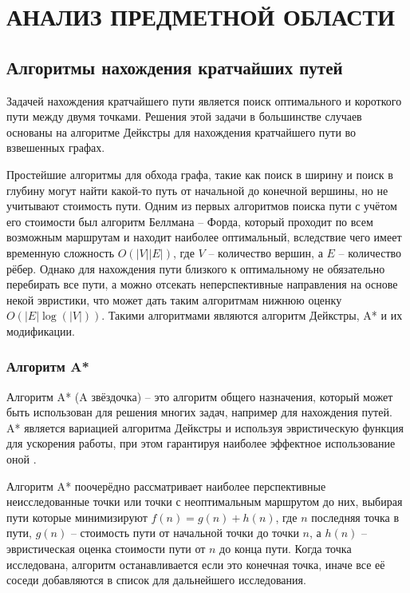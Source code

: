 \section[Анализ предметной области]{\MakeTextUppercase{АНАЛИЗ ПРЕДМЕТНОЙ ОБЛАСТИ}}
\vspace{-1\baselineskip} 
\subsection{Алгоритмы нахождения кратчайших путей}

Задачей нахождения кратчайшего пути является поиск оптимального и короткого пути между двумя точками. Решения этой задачи в большинстве случаев основаны на алгоритме Дейкстры \cite{Dijkstra} для нахождения кратчайшего пути во взвешенных графах. 

Простейшие алгоритмы для обхода графа, такие как поиск в ширину и поиск в глубину могут найти какой-то путь от начальной до конечной вершины, но не учитывают стоимость пути. Одним из первых алгоритмов поиска пути с учётом его стоимости был алгоритм Беллмана -- Форда, который проходит по всем возможным маршрутам и находит наиболее оптимальный, вследствие чего имеет временную сложность $O(|V||E|)$, где $V$ -- количество вершин, а $E$ -- количество рёбер. Однако для нахождения пути близкого к оптимальному не обязательно перебирать все пути, а можно отсекать неперспективные направления на основе некой эвристики, что может дать таким алгоритмам нижнюю оценку $O(|E|\log(|V|))$. Такими алгоритмами являются алгоритм Дейкстры, A* и их модификации.

\subsubsection{Алгоритм A*}

Алгоритм A{*} (A звёздочка) -- это алгоритм общего назначения, который может быть использован для решения многих задач, например для нахождения путей. A{*} является вариацией алгоритма Дейкстры и используя эвристическую функция для ускорения работы, при этом гарантируя наиболее эффектное использование оной \cite{A_STAR}. 

Алгоритм A{*} поочерёдно рассматривает наиболее перспективные неисследованные точки или точки с неоптимальным маршрутом до них, выбирая пути которые минимизируют $ f(n) = g(n) + h(n) $, где $n$ последняя точка в пути, $g(n)$ -- стоимость пути от начальной точки до точки $n$, а $h(n)$ -- эвристическая оценка стоимости пути от $n$ до конца пути. Когда точка исследована, алгоритм останавливается если это конечная точка, иначе все её соседи добавляются в список для дальнейшего исследования.

